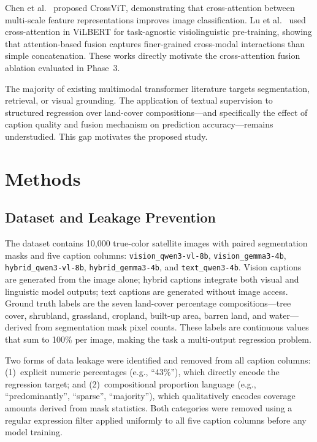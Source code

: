 \documentclass[conference]{IEEEtran}
\begin{document}
Chen et al.\ \cite{chen2021crossvit} proposed CrossViT, demonstrating that
cross-attention between multi-scale feature representations improves image
classification. Lu et al.\ \cite{lu2019vilbert} used cross-attention in ViLBERT for
task-agnostic visiolinguistic pre-training, showing that attention-based fusion captures
finer-grained cross-modal interactions than simple concatenation. These works directly
motivate the cross-attention fusion ablation evaluated in Phase~3.

The majority of existing multimodal transformer literature targets segmentation,
retrieval, or visual grounding. The application of textual supervision to structured
regression over land-cover compositions---and specifically the effect of caption quality
and fusion mechanism on prediction accuracy---remains understudied. This gap motivates
the proposed study.

\section{Methods}

\subsection{Dataset and Leakage Prevention}

The dataset contains 10{,}000 true-color satellite images with paired segmentation masks
and five caption columns: \texttt{vision\_qwen3-vl-8b}, \texttt{vision\_gemma3-4b},
\texttt{hybrid\_qwen3-vl-8b}, \texttt{hybrid\_gemma3-4b}, and \texttt{text\_qwen3-4b}.
Vision captions are generated from the image alone; hybrid captions integrate both
visual and linguistic model outputs; text captions are generated without image access.
Ground truth labels are the seven land-cover percentage compositions---tree cover,
shrubland, grassland, cropland, built-up area, barren land, and water---derived from
segmentation mask pixel counts. These labels are continuous values that sum to
100\% per image, making the task a multi-output regression problem.

Two forms of data leakage were identified and removed from all caption columns:
(1)~explicit numeric percentages (e.g., ``43\%''), which directly encode the regression
target; and (2)~compositional proportion language (e.g., ``predominantly'', ``sparse'',
``majority''), which qualitatively encodes coverage amounts derived from mask statistics.
Both categories were removed using a regular expression filter applied uniformly to all
five caption columns before any model training.
\end{document}
